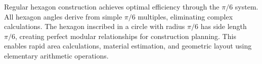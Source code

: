 \documentclass[11pt]{article}
\begin{document}

Regular hexagon construction achieves optimal efficiency through the $\pi/6$ system. All hexagon angles derive from simple $\pi/6$ multiples, eliminating complex calculations. The hexagon inscribed in a circle with radius $\pi/6$ has side length $\pi/6$, creating perfect modular relationships for construction planning. This enables rapid area calculations, material estimation, and geometric layout using elementary arithmetic operations.
\end{document}
